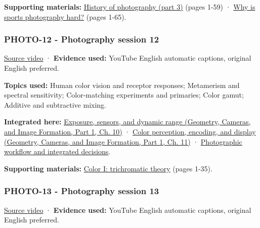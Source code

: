 \textbf{Supporting materials:} \href{https://drive.google.com/open?id=0B6w2XfPHEcZYU1hzN1BtalBqQ1U}{History of photography (part 3)} (pages 1-59) · \href{https://drive.google.com/open?id=0B6w2XfPHEcZYc1BpLTNjZGUzbk0}{Why is sports photography hard?} (pages 1-65).

\subsubsection{PHOTO-12 - Photography session 12}\label{04-visual-computing-ii-ch036-photo-12---photography-session-12}

\hypertarget{04-visual-computing-ii-ch036-photo-12---photography-session-12}{}

\href{https://www.youtube.com/watch?v=gRT0mtabjI4}{Source video} · \textbf{Evidence used:} YouTube English automatic captions, original English preferred.

\textbf{Topics used:} Human color vision and receptor responses; Metamerism and spectral sensitivity; Color-matching experiments and primaries; Color gamut; Additive and subtractive mixing.

\textbf{Integrated here:} \href{../03-Geometry-Cameras-and-Image-Formation-P01/main.pdf\#03-visual-computing-i-ch003-exposure-sensors-and-dynamic-range}{Exposure, sensors, and dynamic range (Geometry, Cameras, and Image Formation, Part 1, Ch. 10)} · \href{../03-Geometry-Cameras-and-Image-Formation-P01/main.pdf\#03-visual-computing-i-ch004-color-perception-encoding-and-display}{Color perception, encoding, and display (Geometry, Cameras, and Image Formation, Part 1, Ch. 11)} · \hyperref[04-visual-computing-ii-ch034-photographic-workflow-and-integrated-decisions]{Photographic workflow and integrated decisions}.

\textbf{Supporting materials:} \href{https://drive.google.com/open?id=0B6w2XfPHEcZYekpvMVN6MkdlZ0U}{Color I: trichromatic theory} (pages 1-35).

\subsubsection{PHOTO-13 - Photography session 13}\label{04-visual-computing-ii-ch036-photo-13---photography-session-13}

\hypertarget{04-visual-computing-ii-ch036-photo-13---photography-session-13}{}

\href{https://www.youtube.com/watch?v=6T_4mVZcozs}{Source video} · \textbf{Evidence used:} YouTube English automatic captions, original English preferred.

